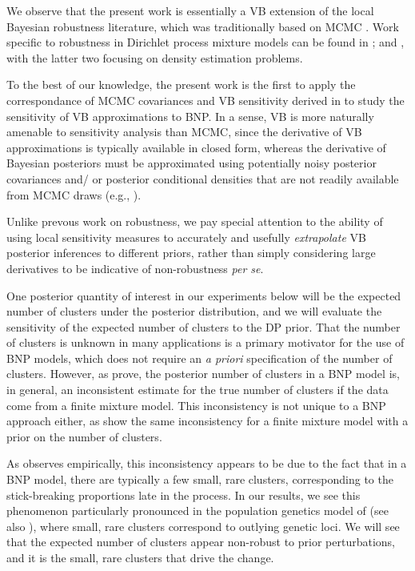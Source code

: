 We observe that the present work is essentially a
VB extension of the local Bayesian robustness literature, which was
traditionally based on MCMC
\citep{gustafson:1996:local, basu:1996:local}.
Work specific to robustness in Dirichlet process mixture models can be found in
\citet{Basu:2000:robustnessBNP, barajas:2009:densitysens}; and \citet{saha:2019:geometricsens},
with the latter two focusing on density estimation problems.

To the best of our knowledge, the present work is the first to apply the
correspondance of MCMC covariances and VB sensitivity derived in
\citep{giordano:2018:covariances} to study the sensitivity of VB approximations to BNP.
In a sense, VB is more naturally
amenable to sensitivity analysis than MCMC, since the derivative of VB
approximations is typically available in closed form, whereas the derivative of
Bayesian posteriors must be approximated using potentially noisy posterior
covariances and/ or posterior conditional densities that are not readily
available from MCMC draws (e.g., \citet{gustafson:1996:marginal}).

Unlike prevous work on robustness, we pay
special attention to the ability of using local sensitivity measures
to accurately and usefully \textit{extrapolate}
VB posterior inferences to different priors, rather than simply considering
large derivatives to be indicative of non-robustness \textit{per se}.

One posterior quantity of interest in our experiments below will be
the expected number of clusters under the posterior distribution,
and we will evaluate the sensitivity of the expected number of clusters
to the DP prior.
That the number of clusters is unknown in many applications
is a primary motivator for the use of BNP models, which does not
require an \textit{a priori} specification of the number of clusters.
However, as \citet{miller:2013:neurips, miller:14:inconsistency} prove,
the posterior number of clusters in a BNP model is,
in general, an inconsistent estimate for the true number of clusters if the
data come from a finite mixture model.
This inconsistency is not unique to a BNP approach either, as
\citet{cai:2020:finite, cai:2020:power} show
the same inconsistency for a finite mixture model with a prior on the number
of clusters.

As \citet{miller:14:inconsistency} observes empirically,
this inconsistency appears to be due to the fact
that in a BNP model, there are typically a few small, rare clusters,
corresponding to the stick-breaking proportions late in the process.
In our results, we see this phenomenon particularly pronounced in
the population genetics model of 
(see also ),
where small, rare clusters correspond to outlying genetic loci.
We will see that the expected number of clusters appear non-robust to prior
perturbations, and it is the small, rare clusters that drive
the change.

